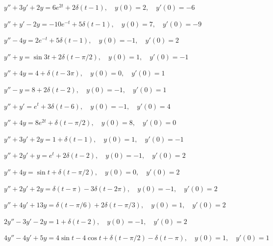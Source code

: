 \begin{exerciselist}
\item\label{exer:8.7.1}$y''+3y'+2y=6e^{2t}+2\delta(t-1), \quad  y(0)=2,\quad y'(0)=-6$


\item\label{exer:8.7.2}\CGex
 $y''+y'-2y=-10e^{-t}+5\delta(t-1), \quad  y(0)=7,\quad y'(0)=-9$


\item\label{exer:8.7.3}$y''-4y=2e^{-t}+5\delta(t-1), \quad  y(0)=-1,\quad y'(0)=2$

\item\label{exer:8.7.4}\CGex
 $y''+y=\sin3t+2\delta(t-\pi/2), \quad  y(0)=1,\quad y'(0)=-1$

\item\label{exer:8.7.5}$y''+4y=4+\delta(t-3\pi), \quad  y(0)=0,\quad y'(0)=1$

\item\label{exer:8.7.6}$y''-y=8+2\delta(t-2), \quad  y(0)=-1,\quad y'(0)=1$

\item\label{exer:8.7.7}$y''+y'=e^t+3\delta(t-6), \quad  y(0)=-1,\quad y'(0)=4$

\item\label{exer:8.7.8}$y''+4y=8e^{2t}+\delta(t-\pi/2), \quad  y(0)=8,\quad y'(0)=0$

\item\label{exer:8.7.9}\CGex
 $y''+3y'+2y=1+\delta(t-1), \quad  y(0)=1,\quad y'(0)=-1$


\item\label{exer:8.7.10}$y''+2y'+y=e^t+2\delta(t-2), \quad  y(0)=-1,\quad y'(0)=2$

\item\label{exer:8.7.11}\CGex
 $y''+4y=\sin t+\delta(t-\pi/2), \quad  y(0)=0,\quad y'(0)=2$

\item\label{exer:8.7.12}$y''+2y'+2y=\delta(t-\pi)-3\delta(t-2\pi), \quad  y(0)=-1,\quad y'(0)=2$

\item\label{exer:8.7.13}$y''+4y'+13y=\delta(t-\pi/6)+2\delta(t-\pi/3), \quad  y(0)=1,\quad y'(0)=2$

\item\label{exer:8.7.14}$2y''-3y'-2y=1+\delta(t-2), \quad  y(0)=-1,\quad y'(0)=2$

\item\label{exer:8.7.15}$4y''-4y'+5y=4\sin t-4\cos
t+\delta(t-\pi/2)-\delta(t-\pi), \quad  y(0)=1,\quad y'(0)=1$


\end{exerciselist}
